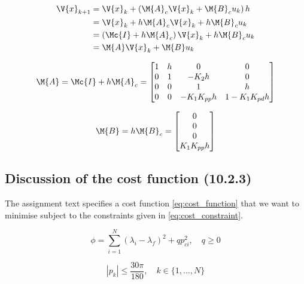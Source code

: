\begin{equation}\label{eq:disc}
\begin{aligned}
	\V{x}_{k+1} &= \V{x}_{k} + \left( \M{A}_{c} \V{x}_{k} + \M{B}_c u_{k} \right) h \\
				&= \V{x}_{k} + h\M{A}_{c}\V{x}_{k} + h\M{B}_{c}u_{k} \\
				&= \left( \Mc{I} + h\M{A}_{c} \right) \V{x}_{k} + h\M{B}_{c}u_{k} \\
				&= \M{A}\V{x}_{k} + \M{B}u_{k}
\end{aligned}
\end{equation}

\begin{equation}\label{eq:disc_matrix_A}
	\M{A} = \Mc{I} + h\M{A}_{c} =
	\begin{bmatrix}
		1 & h & 0 & 0 \\
		0 & 1 & -K_{2}h & 0 \\
		0 & 0 & 1 & h \\
		0 & 0 & -K_{1}K_{pp}h	& 1-K_{1}K_{pd}h
	\end{bmatrix}
\end{equation}

\begin{equation}\label{eq:disc_matrix_B}
	\M{B} = h\M{B}_c =
	\begin{bmatrix} 0 \\ 0 \\ 0 \\ K_{1}K_{pp}h \end{bmatrix}
\end{equation}


\subsection{Discussion of the cost function (10.2.3)}
The assignment text  \cite{_helicopter_2015} specifies a cost function \eqref{eq:cost_function} that we want to minimise subject to the constraints given in \eqref{eq:cost_constraint}.


\begin{equation} \label {eq:cost_function}
	\phi = \sum\limits_{i=1}^N (\lambda_i - \lambda_f)^2 + q p_{ci}^2, \quad q \geq 0 
\end{equation}

\begin{equation} \label{eq:cost_constraint}
	|p_k| \leq \frac{30 \pi}{180}, \quad k \in \{ 1, ..., N \}
\end{equation}

